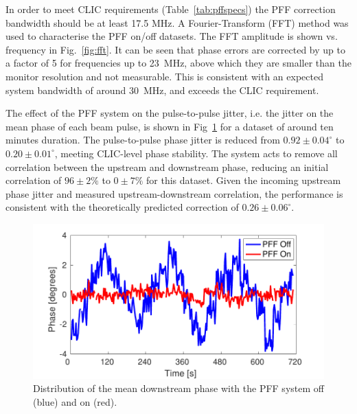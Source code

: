 \documentclass[%
 reprint,
 superscriptaddress,
 amsmath,
 amssymb,
 prl,
]{revtex4-1}
\begin{document}
In order to meet CLIC requirements (Table~\ref{tab:pffspecs}) the PFF 
correction bandwidth should be at least 17.5 MHz. 
A Fourier-Transform (FFT) method was used to characterise the PFF on/off 
datasets. The FFT amplitude is shown vs. frequency in 
Fig.~\ref{fig:fft}. It can be seen that phase errors are corrected by up to a 
factor of 5 for frequencies up to 23~MHz, above which 
they are smaller than the monitor resolution and not measurable. This 
is consistent with an expected system bandwidth of around 30~MHz, and exceeds 
the CLIC requirement.

The effect of the PFF system on the pulse-to-pulse jitter, i.e. the jitter on 
the mean phase of each beam pulse, is shown in Fig~\ref{fig:meanJit} for a 
dataset of around ten minutes duration.
The pulse-to-pulse phase jitter is reduced from  \(0.92\pm0.04^\circ\) to 
\(0.20\pm0.01^\circ\), meeting CLIC-level phase stability. 
The system acts to remove all correlation between the upstream and 
downstream phase, reducing an initial correlation of \(96\pm2\%\) to 
\(0\pm7\%\) for this dataset.
Given the incoming upstream phase jitter and 
measured upstream-downstream correlation, the performance is consistent with 
the theoretically predicted correction of \(0.26\pm0.06^\circ\).

\begin{figure}
	\includegraphics[width=\columnwidth]{toSubmit/fig8}
	\caption{\label{fig:meanJit}Distribution of the mean downstream phase with 
		the 
		PFF system off (blue) and on (red).}
\end{figure}

\end{document}
